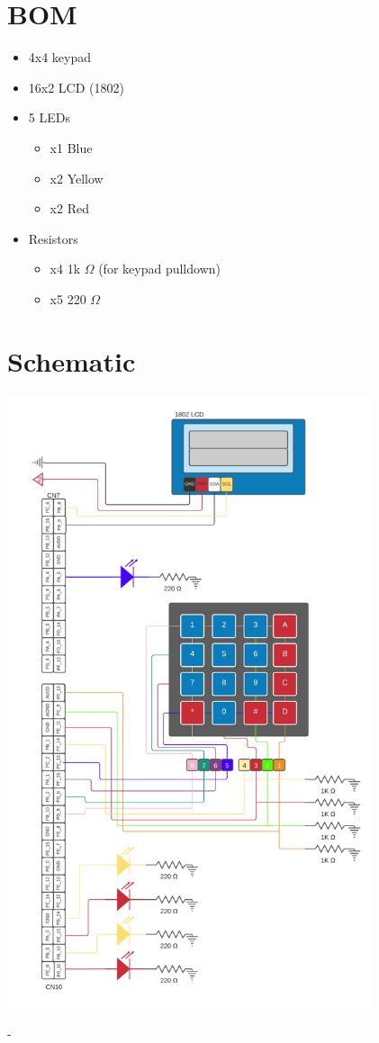 \documentclass{article}
\begin{document}
\section{BOM}
\begin{itemize}
    \item 4x4 keypad
    \item 16x2 LCD (1802)
    \item 5 LEDs
    \begin{itemize}
        \item x1 Blue
        \item x2 Yellow
        \item x2 Red 
    \end{itemize}

    \item Resistors

    \begin{itemize}
        \item x4 1k  $\Omega$ (for keypad pulldown)
        \item x5 220  $\Omega$
    \end{itemize}

  \end{itemize}

\section{Schematic}
    \begin{center}
        {\includegraphics[height=18cm]{graphics/CSE321_project2_schematic.png}\centering} 
    \end{center}
    -
\newline
\end{document}

